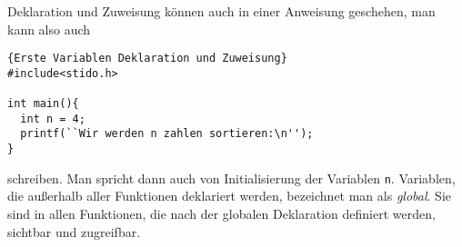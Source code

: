 Deklaration und Zuweisung können auch in einer Anweisung geschehen, man kann also auch
\begin{lstlisting}{Erste Variablen Deklaration und Zuweisung}
#include<stido.h>

int main(){
  int n = 4;
  printf(``Wir werden n zahlen sortieren:\n'');
}
\end{lstlisting}
schreiben. 
Man spricht dann auch von Initialisierung der Variablen \texttt{n}.
Variablen, die außerhalb aller Funktionen deklariert werden, bezeichnet man als \emph{global}.
Sie sind in allen Funktionen, die nach der globalen Deklaration definiert werden, sichtbar und zugreifbar.

%
